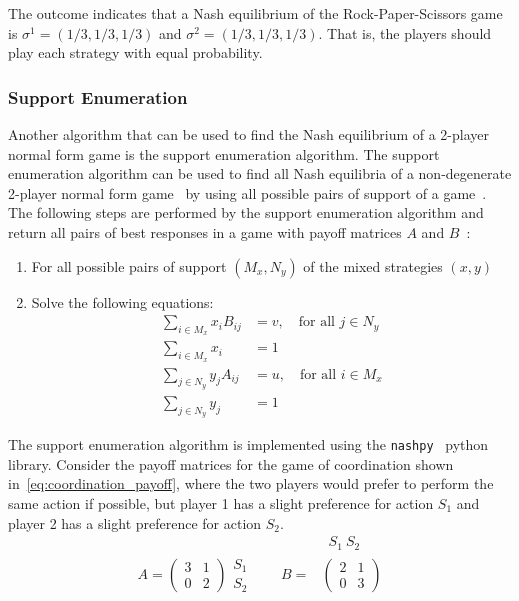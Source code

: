 The outcome indicates that a Nash equilibrium of the Rock-Paper-Scissors game
is \(\sigma^1 = (1/3, 1/3, 1/3)\) and \(\sigma^2 = (1/3, 1/3, 1/3)\).
That is, the players should play each strategy with equal probability.


\subsubsection{Support Enumeration}

Another algorithm that can be used to find the Nash equilibrium of a 2-player
normal form game is the support enumeration algorithm.
The support enumeration algorithm can be used to find all Nash equilibria of a
non-degenerate 2-player normal form game~\cite{degenerategames} by using all
possible pairs of support of a game~\cite{myerson1997game}.
The following steps are performed by the support enumeration algorithm and
return all pairs of best responses in a game with payoff matrices \(A\) and
\(B\)~\cite{supportenumeration}:

\begin{enumerate}
    \item For all possible pairs of support \((M_x, N_y)\) of the mixed
    strategies \((x, y)\)
    \item Solve the following equations:
    \begin{align}
        \sum_{i \in M_x} x_i B_{ij} &= v, \quad \text{for all } j \in N_y \\
        \sum_{i \in M_x} x_i &= 1 \\
        \sum_{j \in N_y} y_j A_{ij} &= u, \quad \text{for all } i \in M_x \\
        \sum_{j \in N_y} y_j &= 1
    \end{align}
\end{enumerate}

The support enumeration algorithm is implemented using the
\texttt{nashpy}~\cite{thenashpyproject} python library.
Consider the payoff matrices for the game of coordination shown
in~\eqref{eq:coordination_payoff}, where the two players would prefer to
perform the same action if possible, but player 1 has a slight preference
for action \(S_1\) and player 2 has a slight preference for action \(S_2\).
\begin{align}
    & \ \; S_1 \ S_2 \nonumber \\
    A =
    \begin{pmatrix}
        3 & 1 \\
        0 & 2
    \end{pmatrix}
    \begin{matrix}
        S_1 \\
        S_2
    \end{matrix} \qquad
    B = &
    \begin{pmatrix}
        2 & 1 \\
        0 & 3
    \end{pmatrix}
    \label{eq:coordination_payoff}
\end{align}

